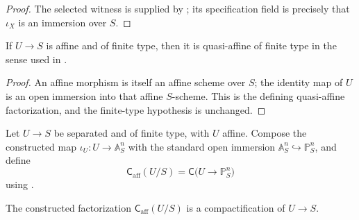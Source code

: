 \begin{proof}
  The selected witness is supplied by
  ; its
  specification field is precisely that $\iota_X$ is an immersion over $S$.
\end{proof}

\begin{lemma}
  \label{lemma:nagata-affine-finite-type-is-quasi-affine}

  If $U\to S$ is affine and of finite type, then it is quasi-affine of finite
  type in the sense used in
  .
\end{lemma}

\begin{proof}
  An affine morphism is itself an affine scheme over $S$; the identity map of
  $U$ is an open immersion into that affine $S$-scheme.  This is the defining
  quasi-affine factorization, and the finite-type hypothesis is unchanged.
\end{proof}

\begin{definition}
  \label{def:nagata-affine-compactification}

  Let $U\to S$ be separated and of finite type, with $U$ affine.  Compose
  the constructed map $\iota_U\colon U\to\mathbb A^n_S$ with the standard
  open immersion $\mathbb A^n_S\hookrightarrow\mathbb P^n_S$, and define
  \[
    \mathsf C_{\mathrm{aff}}(U/S)
      =\mathsf C\bigl(U\longrightarrow\mathbb P^n_S\bigr)
  \]
  using .
\end{definition}

\begin{proposition}
  \label{prop:nagata-affine-compactification}

  The constructed factorization $\mathsf C_{\mathrm{aff}}(U/S)$ is a
  compactification of $U\to S$.
\end{proposition}

